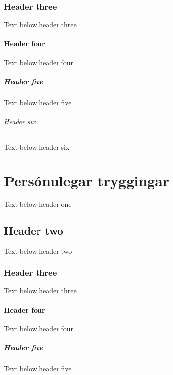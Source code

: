 \documentclass[a4paper,10pt,icelandic]{sphinxmanual}
\begin{document}
\subsection{Header three}
\label{\detokenize{skuldir-og-lan/index:header-three}}
\sphinxAtStartPar
Text below header three


\subsubsection{Header four}
\label{\detokenize{skuldir-og-lan/index:header-four}}
\sphinxAtStartPar
Text below header four


\paragraph{Header five}
\label{\detokenize{skuldir-og-lan/index:header-five}}
\sphinxAtStartPar
Text below header five


\subparagraph{Header six}
\label{\detokenize{skuldir-og-lan/index:header-six}}
\sphinxAtStartPar
Text below header six

\sphinxstepscope


\chapter{Persónulegar tryggingar}
\label{\detokenize{personulegar-tryggingar/index:personulegar-tryggingar}}\label{\detokenize{personulegar-tryggingar/index::doc}}
\sphinxAtStartPar
Text below header one


\section{Header two}
\label{\detokenize{personulegar-tryggingar/index:header-two}}
\sphinxAtStartPar
Text below header two


\subsection{Header three}
\label{\detokenize{personulegar-tryggingar/index:header-three}}
\sphinxAtStartPar
Text below header three


\subsubsection{Header four}
\label{\detokenize{personulegar-tryggingar/index:header-four}}
\sphinxAtStartPar
Text below header four


\paragraph{Header five}
\label{\detokenize{personulegar-tryggingar/index:header-five}}
\sphinxAtStartPar
Text below header five
\end{document}
